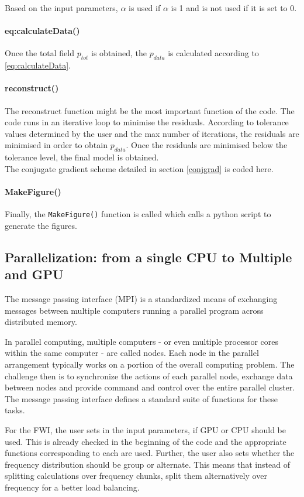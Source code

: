 \documentclass[10pt,a4paper]{article}
\begin{document}
Based on the input parameters, $\alpha$ is used
if $\alpha$ is 1 and is not used if it is set
to 0.

\paragraph{eq:calculateData()}
Once the total field $p_{tot}$ is obtained, the $p_{data}$ is
calculated according to \ref{eq:calculateData}.

\paragraph{reconstruct()}
The reconstruct function might be the most important function of the
code. The code runs in an iterative loop to minimise the residuals.
According to tolerance values determined by the user and the max
number of iterations, the residuals are minimised in order to obtain
$p_{data}$. Once the residuals are minimised below the tolerance
level, the final model is obtained.\\

The conjugate gradient scheme detailed in section \ref{conjgrad} is coded here.

\paragraph{MakeFigure()}

Finally, the \texttt{MakeFigure()} function is called which calls a
python script to generate the figures.

\subsection{Parallelization: from a single CPU to Multiple and GPU}
The message passing interface (MPI) is a standardized means of
exchanging messages between multiple computers running a parallel
program across distributed memory.

In parallel computing, multiple computers - or even multiple processor
cores within the same computer - are called nodes.  Each node in the
parallel arrangement typically works on a portion of the overall
computing problem. The challenge then is to synchronize the actions of
each parallel node, exchange data between nodes and provide command
and control over the entire parallel cluster. The message passing
interface defines a standard suite of functions for these tasks.

For the FWI, the user sets in the input parameters, if GPU or CPU
should be used. This is already checked in the beginning of the code
and the appropriate functions corresponding to each are used. Further,
the user also sets whether the frequency distribution should be group
or alternate. This means that instead of splitting calculations over
frequency chunks, split them alternatively over frequency for a better
load balancing.
\end{document}
